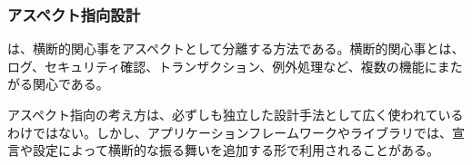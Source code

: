 \subsubsection{アスペクト指向設計}

 は、横断的関心事をアスペクトとして分離する方法である。横断的関心事とは、ログ、セキュリティ確認、トランザクション、例外処理など、複数の機能にまたがる関心である。

アスペクト指向の考え方は、必ずしも独立した設計手法として広く使われているわけではない。しかし、アプリケーションフレームワークやライブラリでは、宣言や設定によって横断的な振る舞いを追加する形で利用されることがある。
